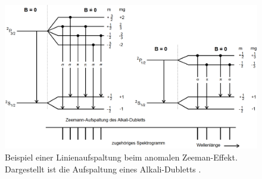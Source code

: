 \begin{figure}
	\centering
	\includegraphics[width=\linewidth-50pt,height=\textheight-50pt,keepaspectratio]{content/Images/anomaleAufspaltung.png}
    \caption{Beispiel einer Linienaufspaltung beim anomalen Zeeman-Effekt. Dargestellt ist die Aufspaltung eines Alkali-Du­bletts \cite{V27}.}
    \label{fig:anomaleAufspaltung}
\end{figure}

